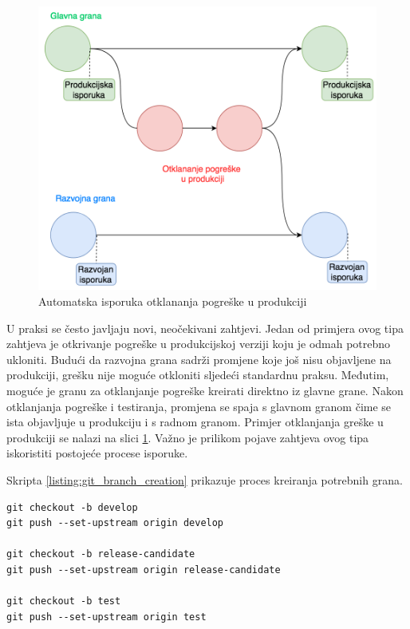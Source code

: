 \documentclass[times, utf8, diplomski, numeric]{fer}
\begin{document}
\begin{figure}[b!]
\centering
\includegraphics[scale=0.5]{HotfixGitflow}
\caption{Automatska isporuka otklananja pogreške u produkciji}
\label{fig:HotfixGitflow}
\end{figure}

U praksi se često javljaju novi, neočekivani zahtjevi. Jedan od primjera ovog tipa zahtjeva je otkrivanje pogreške u produkcijskoj verziji koju je odmah potrebno ukloniti. Budući da razvojna grana sadrži promjene koje još nisu objavljene na produkciji, grešku nije moguće otkloniti sljedeći standardnu praksu. Međutim, moguće je granu za otklanjanje pogreške kreirati direktno iz glavne grane. Nakon otklanjanja pogreške i testiranja, promjena se spaja s glavnom granom čime se ista objavljuje u produkciju i s radnom granom. Primjer otklanjanja greške u produkciji se nalazi na slici \ref{fig:HotfixGitflow}. Važno je prilikom pojave zahtjeva ovog tipa iskoristiti postojeće procese isporuke.

Skripta \ref{listing:git_branch_creation} prikazuje proces kreiranja potrebnih grana.

\begin{lstlisting}[caption=Kreiranje potrebnih grana Gitflow radnog toka, label=listing:git_branch_creation]
git checkout -b develop
git push --set-upstream origin develop

git checkout -b release-candidate
git push --set-upstream origin release-candidate

git checkout -b test
git push --set-upstream origin test
\end{lstlisting}
\end{document}
